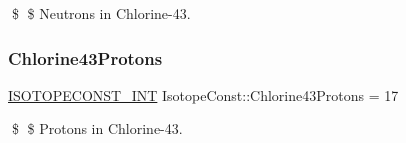 \$ \$ Neutrons in Chlorine-\/43. \mbox{\label{group___isotope_const-_chlorine-_cl43_ga8c90bdfdfa417f64814a2c20c4a1feb3}} 
\subsubsection{\texorpdfstring{Chlorine43\+Protons}{Chlorine43Protons}}
{\footnotesize\ttfamily \mbox{\hyperlink{group___isotope_const-_macros_ga5f18360b3e99483a35c32d789e62621c}{I\+S\+O\+T\+O\+P\+E\+C\+O\+N\+S\+T\+\_\+\+I\+NT}} Isotope\+Const\+::\+Chlorine43\+Protons = 17}

\$ \$ Protons in Chlorine-\/43. 